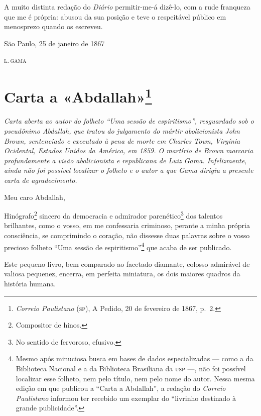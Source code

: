 A muito distinta redação do \emph{Diário} permitir-me-á dizê-lo, com a
rude franqueza que me é própria: abusou da sua posição e teve o
respeitável público em menosprezo quando os escreveu.

\begin{flushright}
São Paulo, 25 de janeiro de 1867

\textsc{l.\,gama}
\end{flushright}

\chapter{Carta a «Abdallah»\footnote{\emph{Correio Paulistano}
  (\textsc{sp}), A Pedido, 20 de fevereiro de 1867, p.~2.}}

\begin{didascalia}\itshape
Carta aberta ao autor do folheto ``Uma sessão de espiritismo'',
resguardado sob o pseudônimo Abdallah, que tratou do julgamento
do mártir abolicionista John Brown, sentenciado e executado à pena de
morte em Charles Town, Virgínia Ocidental, Estados Unidos da América, em
1859. O martírio de Brown marcaria profundamente a visão abolicionista e
republicana de Luiz Gama. Infelizmente, ainda não foi possível localizar
o folheto e o autor a que Gama dirigiu a presente carta de
agradecimento.
\end{didascalia}




Meu caro Abdallah,

Hinógrafo\footnote{Compositor de hinos.} sincero da democracia e
admirador parenético\footnote{No sentido de fervoroso, efusivo.} dos
talentos brilhantes, como o vosso, em me confessaria criminoso, perante
a minha própria consciência, se comprimindo o coração, não dissesse duas
palavras sobre o vosso precioso folheto ``Uma sessão de
espiritismo''\footnote{Mesmo após minuciosa busca em bases de dados
  especializadas --- como a da Biblioteca Nacional e a da Biblioteca
  Brasiliana da \textsc{usp} ---, não foi possível localizar esse folheto, nem
  pelo título, nem pelo nome do autor. Nessa mesma edição em que
  publicou a ``Carta a Abdallah'', a redação do \emph{Correio
  Paulistano} informou ter recebido um exemplar do ``livrinho destinado à
  grande publicidade''.} que acaba de ser publicado.

Este pequeno livro, bem comparado ao facetado diamante, colosso
admirável de valiosa pequenez, encerra, em perfeita miniatura, os dois
maiores quadros da história humana.

